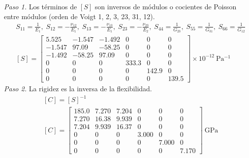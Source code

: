 \documentclass[11pt]{article}
\begin{document}
\textit{Paso 1.} Los términos de $[S]$ son inversos de módulos o cocientes de Poisson entre módulos (orden de Voigt 1, 2, 3, 23, 31, 12).
\begin{align*}
&S_{11}=\frac{1}{E_1},\; S_{12}=-\frac{\nu_{12}}{E_1},\; S_{13}=-\frac{\nu_{13}}{E_1},\; S_{23}=-\frac{\nu_{23}}{E_2},\; S_{44}=\frac{1}{G_{23}},\; S_{55}=\frac{1}{G_{31}},\; S_{66}=\frac{1}{G_{12}} \\
&[S]=\begin{bmatrix}5.525 & -1.547 & -1.492 & 0 & 0 & 0 \\ -1.547 & 97.09 & -58.25 & 0 & 0 & 0 \\ -1.492 & -58.25 & 97.09 & 0 & 0 & 0 \\ 0 & 0 & 0 & 333.3 & 0 & 0 \\ 0 & 0 & 0 & 0 & 142.9 & 0 \\ 0 & 0 & 0 & 0 & 0 & 139.5\end{bmatrix}\times10^{-12}\ \mathrm{Pa^{-1}}
\end{align*}
\textit{Paso 2.} La rigidez es la inversa de la flexibilidad.
\begin{align*}
&[C]=[S]^{-1} \\
&[C]=\begin{bmatrix}185.0 & 7.270 & 7.204 & 0 & 0 & 0 \\ 7.270 & 16.38 & 9.939 & 0 & 0 & 0 \\ 7.204 & 9.939 & 16.37 & 0 & 0 & 0 \\ 0 & 0 & 0 & 3.000 & 0 & 0 \\ 0 & 0 & 0 & 0 & 7.000 & 0 \\ 0 & 0 & 0 & 0 & 0 & 7.170\end{bmatrix}\ \mathrm{GPa}
\end{align*}
\end{document}
